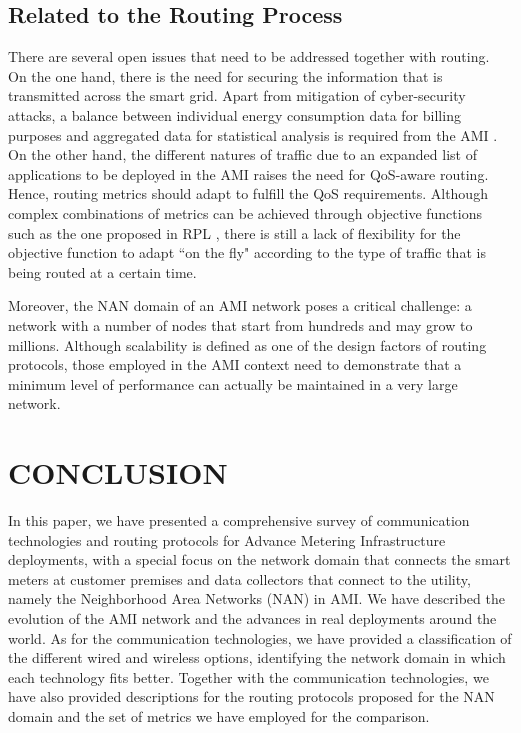 \documentclass[10pt,twocolumn,twoside,submit]{JCNtran}
\begin{document}
\subsection{Related to the Routing Process}

There are several open issues that need to be addressed together with routing. On the one hand, there is the need for securing the information that is transmitted across the smart grid. Apart from mitigation of cyber-security attacks, a balance between individual energy consumption data for billing purposes and aggregated data for statistical analysis is required from the AMI \cite{Saputro2012}. On the other hand, the different natures of traffic due to an expanded list of applications to be deployed in the AMI raises the need for QoS-aware routing. Hence, routing metrics should adapt to fulfill the QoS requirements. Although complex combinations of metrics can be achieved through objective functions such as the one proposed in RPL  \cite{Dohler2009}, there is still a lack of flexibility for the objective function to adapt ``on the fly" according to the type of traffic that is being routed at a certain time. 

Moreover, the NAN domain of an AMI network poses a critical challenge: a network with a number of nodes that start from hundreds and may grow to millions. Although scalability is defined as one of the design factors of routing protocols, those employed in the AMI context need to demonstrate that a minimum level of performance can actually be maintained in a very large network.

\vspace{10pt}
\section{\uppercase{Conclusion}}
\label{sec:conclusion}

In this paper, we have presented a comprehensive survey of communication technologies and routing protocols for Advance Metering Infrastructure deployments, with a special focus on the network domain that connects the smart meters at customer premises and data collectors that connect to the utility, namely the Neighborhood Area Networks (NAN) in AMI. We have described the evolution of the AMI network and the advances in real deployments around the world. As for the communication technologies, we have provided a classification of the different wired and wireless options, identifying the network domain in which each technology fits better. Together with the communication technologies, we have also provided descriptions for the routing protocols proposed for the NAN domain and the set of metrics we have employed for the comparison. 
\end{document}
